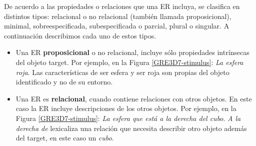 De acuerdo a las propiedades o relaciones que una ER incluya, se clasifica en distintos tipos: relacional o no relacional (tambi\'en llamada proposicional), minimal, sobreespecificada, subespecificada o parcial, plural o singular. A continuaci\'on describimos cada uno de estos tipos.
\begin{itemize}
\item Una ER {\bf proposicional} o no relacional, incluye s\'olo propiedades intr\'insecas del objeto target. Por ejemplo, en la Figura \ref{GRE3D7-stimulus}: {\it La esfera roja}. Las caracter\'isticas de ser esfera y ser roja son propias del objeto identificado y no de su entorno.

\item Una ER es {\bf relacional}, cuando contiene relaciones con otros objetos. En este caso la ER incluye descripciones de los otros objetos. Por ejemplo, en la Figura \ref{GRE3D7-stimulus}: {\it La esfera que est\'a a la derecha del cubo}. {\it A la derecha de} lexicaliza una relaci\'on que necesita describir otro objeto adem\'as del target, en este caso un {\it cubo}.


\end{itemize}
